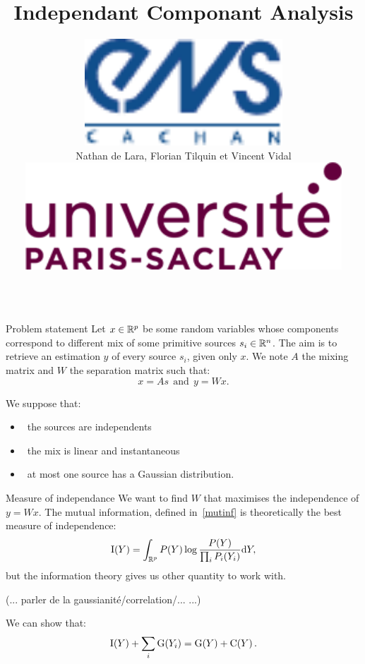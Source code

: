 \documentclass{beamer}
\title{\Huge Independant Componant Analysis}
\author[Lara, Tilquin, Vidal]
{
	\parbox{.25\textwidth}{\includegraphics[height=4cm]{ENS_cachan.pdf}}%
	\parbox{.5\textwidth}{\hfil \huge Nathan de Lara, Florian Tilquin et Vincent Vidal \hfil}%
	\parbox{.25\textwidth}{\hspace{2cm} \includegraphics[height=4cm]{UPS.png}}%
}
\institute[Université Paris-Saclay]{\LARGE Master Mathématiques, Vision et Apprentissage}
\date{}
\newcommand{\zZ}[2]{\mathrm #1\!\zp{#2}}
\begin{document}
\begin{frame}{}
	\maketitle
\begin{columns}[T]
\begin{column}{.48\linewidth}


\begin{block}{Problem statement}
Let $x\in\mathbb{R}^p$ be some random variables whose components correspond to different mix of some primitive sources $s_i\in\mathbb{R}^n$. The aim is to retrieve an estimation $y$ of every source $s_i$, given only $x$. We note $A$ the mixing matrix and $W$ the separation matrix such that:
\begin{equation}
\label{pb}
 x = A s \ \ \mbox{and} \ \ y = W x.
\end{equation}

We suppose that:\begin{itemize}
\item \ the sources are independents
\item \ the mix is linear and instantaneous
\item \ at most one source has a Gaussian distribution.  
\end{itemize}
\end{block}


\begin{block}{Measure of independance}
We want to find $W$ that maximises the independence of $y=Wx$. The mutual information, defined in~\ref{mutinf} is theoretically the best measure of independence:
\begin{equation}
\label{mutinf}
\zZ IY = \int_{\zR^p} P(Y) \log\frac{P(Y)}{\prod_i P_i(Y_i)} \zdx Y,
\end{equation}
but the information theory gives us other quantity to work with.

(... parler de la gaussianité/correlation/... ...)

We can show that:
\begin{equation}
\label{pyt}
        \zZ IY + \sum_i\zZ G{Y_i} = \zZ GY + \zZ CY.
\end{equation}



\end{block}
\end{column}
\end{columns}
\end{frame}
\end{document}
